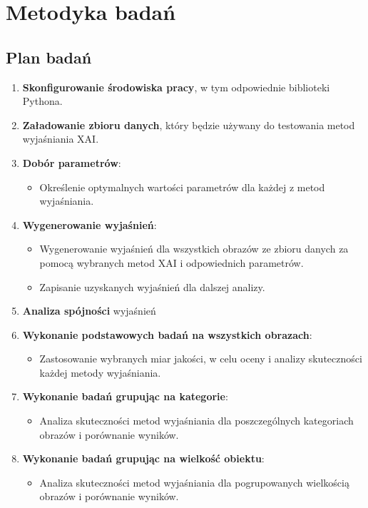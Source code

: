 
\chapter*{Metodyka badań}

\section*{Plan badań}

\begin{enumerate}
	\item \textbf{Skonfigurowanie środowiska pracy}, w tym odpowiednie biblioteki Pythona.
	\item \textbf{Załadowanie zbioru danych}, który będzie używany do testowania metod wyjaśniania XAI.
	\item \textbf{Dobór parametrów}:
	      \begin{itemize}
		      \item Określenie optymalnych wartości parametrów dla każdej z metod wyjaśniania.
	      \end{itemize}
	\item \textbf{Wygenerowanie wyjaśnień}:
	      \begin{itemize}
		      \item Wygenerowanie wyjaśnień dla wszystkich obrazów ze zbioru danych za pomocą wybranych metod XAI i odpowiednich parametrów.
		      \item Zapisanie uzyskanych wyjaśnień dla dalszej analizy.
	      \end{itemize}
	\item \textbf{Analiza spójności} wyjaśnień
	\item \textbf{Wykonanie podstawowych badań na wszystkich obrazach}:
	      \begin{itemize}
		      \item Zastosowanie wybranych miar jakości, w celu oceny i analizy skuteczności każdej metody wyjaśniania.
	      \end{itemize}
	\item \textbf{Wykonanie badań grupując na kategorie}:
	      \begin{itemize}
		      \item Analiza skuteczności metod wyjaśniania dla poszczególnych kategoriach obrazów i porównanie wyników.
	      \end{itemize}
	\item \textbf{Wykonanie badań grupując na wielkość obiektu}:
	      \begin{itemize}
		      \item Analiza skuteczności metod wyjaśniania dla pogrupowanych wielkością obrazów i porównanie wyników.
	      \end{itemize}


\end{enumerate}

